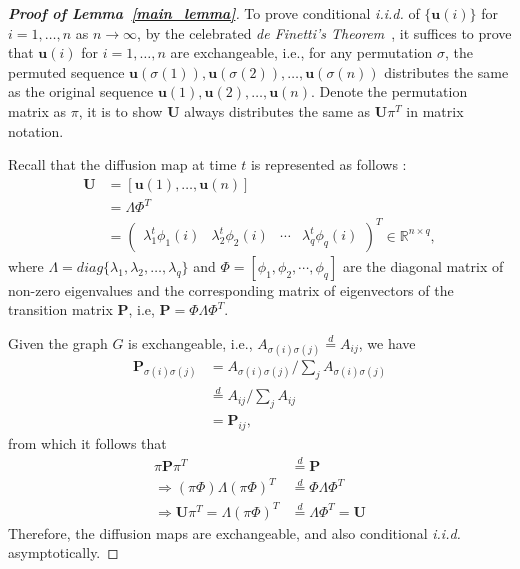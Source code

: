 \documentclass[11pt]{article}
\theoremstyle{definition}
\begin{document}
\begin{proof}[\textbf{Proof of Lemma~\ref{main_lemma}}]
	To prove conditional \textit{i.i.d.} of $\{\mathbf{u}(i)\}$ for $i=1,\ldots,n$ as $n \rightarrow \infty$, by the celebrated \textit{de Finetti's Theorem}~\cite{diaconis1980finite}, it suffices to prove that $\mathbf{u}(i)$ for $i=1,\ldots,n$ are exchangeable, i.e., for any permutation $\sigma$, the permuted sequence $\mathbf{u}(\sigma(1)), \mathbf{u}(\sigma(2)), \ldots,\mathbf{u}(\sigma(n))$ distributes the same as the original sequence $\mathbf{u}(1), \mathbf{u}(2), \ldots,\mathbf{u}(n)$. Denote the permutation matrix as $\pi$, it is to show $\mathbf{U}$ always distributes the same as $\mathbf{U}\pi^{T}$ in matrix notation. 
	
	Recall that the diffusion map at time $t$ is represented as follows :
	\begin{align*}
	\mathbf{U} &=[ \mathbf{u}(1) , \ldots, \mathbf{u}(n) ]\\
    &= \Lambda \Phi^{T} \\
    &= \begin{pmatrix} \lambda^{t}_{1} \phi_{1}(i) & \lambda^{t}_{2} \phi_{2} (i)  & \cdots & \lambda^{t}_{q} \phi_{q}(i) \end{pmatrix}^{T} \in \mathbb{R}^{n \times q},
	\end{align*}
	where $\Lambda=diag\{ \lambda_{1},\lambda_2,\ldots,\lambda_q \}$ and $\Phi =[ \phi_1, \phi_2,\cdots,\phi_q ]$ are the diagonal matrix of non-zero eigenvalues and the corresponding matrix of eigenvectors of the transition matrix $\mathbf{P}$, i.e, $\mathbf{P}=\Phi \Lambda \Phi^{T}$. 
    
Given the graph $G$ is exchangeable, i.e., $A_{\sigma(i)\sigma(j)} \stackrel{d}{=} A_{ij}$, we have
				\begin{align*}
	\mathbf{P}_{\sigma(i) \sigma(j)} &= A_{\sigma(i) \sigma(j)} / \sum\limits_{j} A_{\sigma(i)\sigma(j)} \\
	  &\stackrel{d}{=} A_{ij} /  \sum\limits_{j} A_{ij} \\
		&= \mathbf{P}_{ij},
	\end{align*}
    from which it follows that
    \begin{align*}
	 \pi\mathbf{P} \pi^{T} &\stackrel{d}{=} \mathbf{P} \\
	  \Rightarrow (\pi \Phi) \Lambda (\pi\Phi)^{T} &\stackrel{d}{=} \Phi \Lambda \Phi^{T} \\
		\Rightarrow \mathbf{U}\pi^{T}= \Lambda (\pi\Phi)^{T} &\stackrel{d}{=} \Lambda \Phi^{T} = \mathbf{U}
	\end{align*}	
	Therefore, the diffusion maps are exchangeable, and also conditional \textit{i.i.d.} asymptotically.
\end{proof}
\end{document}
